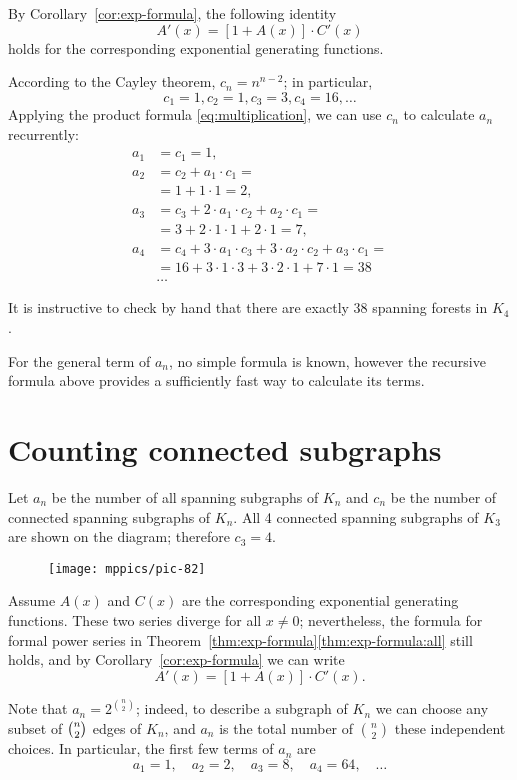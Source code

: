 By Corollary~\ref{cor:exp-formula}, the following identity
\[A'(x)=[1+A(x)]\cdot C'(x)\]
holds for the corresponding exponential generating functions.

According to the Cayley theorem, $c_n=n^{n-2}$;
in particular,
\[c_1=1, c_2=1, c_3=3, c_4=16,\dots\]
Applying the product formula \ref{eq:multiplication}, we can use $c_n$ to calculate $a_n$ recurrently:
\begin{align*}
a_1&=c_1=1,
\\
a_2&=c_2+a_1\cdot c_1=
\\&=1+1\cdot 1=2,
\\
a_3&=c_3+2\cdot a_1\cdot c_2+ a_2\cdot c_1=
\\
&=3+2\cdot1\cdot 1+2\cdot 1=7,
\\
a_4&=c_4+3\cdot a_1\cdot c_3+3\cdot a_2\cdot c_2+a_3\cdot c_1=
\\&=16+3\cdot 1\cdot 3+3\cdot 2\cdot 1+7\cdot 1=38
\\
&\dots
\end{align*}

It is instructive to check by hand that there are exactly $38$ spanning forests in $K_4$.

For the general term of $a_n$, no simple formula is known,
however the recursive formula above provides a sufficiently fast way to calculate its terms.


\section*{Counting connected subgraphs}

Let $a_n$ be the number of all spanning subgraphs of $K_n$ and $c_n$ be the number of connected spanning subgraphs of $K_n$.
All 4 connected spanning subgraphs of $K_3$ are shown on the diagram; therefore $c_3=4$.

\begin{figure}[h!]
\vskip-0mm
\centering
\texttt{[image: mppics/pic-82]}
\end{figure}

Assume $A(x)$ and $C(x)$ are the corresponding exponential generating functions.
These two series diverge for all $x\ne 0$;
nevertheless, the formula for formal power series in Theorem~\ref{thm:exp-formula}\ref{thm:exp-formula:all}
still holds, and by Corollary~\ref{cor:exp-formula} we can write
\[A'(x)=[1+A(x)]\cdot C'(x).\]

Note that $a_n=2^{\binom n2}$;
indeed, to describe a subgraph of $K_n$ we can choose any subset of $\tbinom n2$ edges of $K_n$, and $a_n$ is the total number of $\binom n2$ these independent choices.
In particular, the first few terms of $a_n$ are
\[a_1=1,\quad a_2=2,\quad a_3=8,\quad a_4=64,\quad\dots\]

